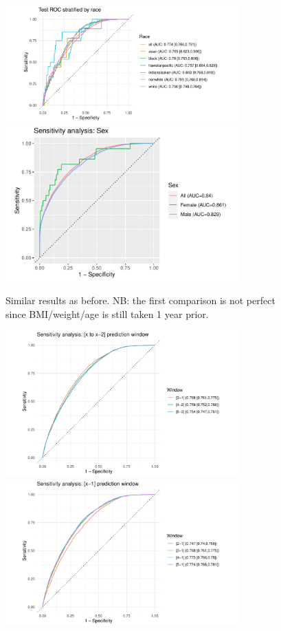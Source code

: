 \documentclass[12pt]{article}
\begin{document}
\clearpage
\begin{figure}[h]
\centering
\includegraphics[width=0.8\textwidth]{figures/roc_Race.pdf}
\includegraphics[width=0.8\textwidth]{figures/roc_Gender.pdf}
\caption{Similar results as before. NB: the first comparison is
not perfect since BMI/weight/age is still taken 1 year prior.}
\end{figure}


\clearpage
\begin{figure}[h]
\centering
\includegraphics[width=0.8\textwidth]{figures/roc_window_2.pdf}
\includegraphics[width=0.8\textwidth]{figures/roc_window_x-1.pdf}
\end{figure}
\end{document}
